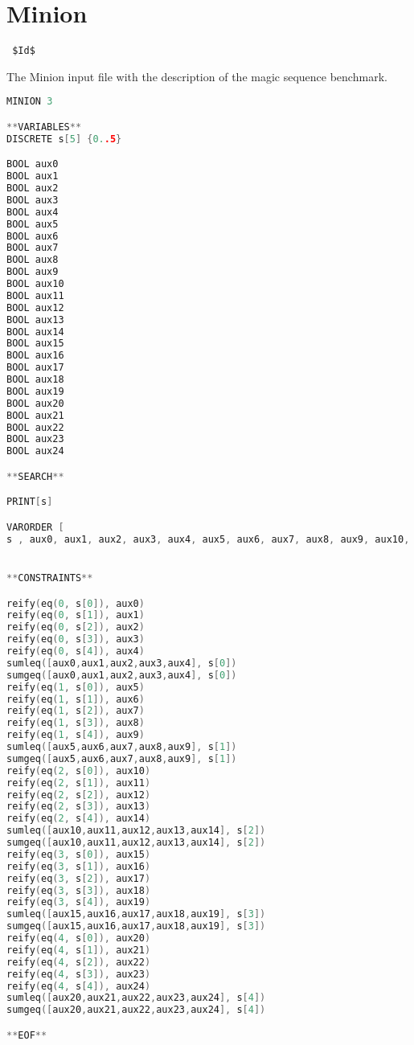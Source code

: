 \section{Minion}
\label{implementation:minion}
\verb= $Id$ =

The Minion input file with the description of the magic sequence benchmark. 

\begin{lstlisting}[language=C++]
MINION 3

**VARIABLES**
DISCRETE s[5] {0..5}

BOOL aux0
BOOL aux1
BOOL aux2
BOOL aux3
BOOL aux4
BOOL aux5
BOOL aux6
BOOL aux7
BOOL aux8
BOOL aux9
BOOL aux10
BOOL aux11
BOOL aux12
BOOL aux13
BOOL aux14
BOOL aux15
BOOL aux16
BOOL aux17
BOOL aux18
BOOL aux19
BOOL aux20
BOOL aux21
BOOL aux22
BOOL aux23
BOOL aux24

**SEARCH**

PRINT[s]

VARORDER [
s , aux0, aux1, aux2, aux3, aux4, aux5, aux6, aux7, aux8, aux9, aux10, aux11, aux12, aux13, aux14, aux15, aux16, aux17, aux18, aux19, aux20, aux21, aux22, aux23, aux24]


**CONSTRAINTS**

reify(eq(0, s[0]), aux0)
reify(eq(0, s[1]), aux1)
reify(eq(0, s[2]), aux2)
reify(eq(0, s[3]), aux3)
reify(eq(0, s[4]), aux4)
sumleq([aux0,aux1,aux2,aux3,aux4], s[0])
sumgeq([aux0,aux1,aux2,aux3,aux4], s[0])
reify(eq(1, s[0]), aux5)
reify(eq(1, s[1]), aux6)
reify(eq(1, s[2]), aux7)
reify(eq(1, s[3]), aux8)
reify(eq(1, s[4]), aux9)
sumleq([aux5,aux6,aux7,aux8,aux9], s[1])
sumgeq([aux5,aux6,aux7,aux8,aux9], s[1])
reify(eq(2, s[0]), aux10)
reify(eq(2, s[1]), aux11)
reify(eq(2, s[2]), aux12)
reify(eq(2, s[3]), aux13)
reify(eq(2, s[4]), aux14)
sumleq([aux10,aux11,aux12,aux13,aux14], s[2])
sumgeq([aux10,aux11,aux12,aux13,aux14], s[2])
reify(eq(3, s[0]), aux15)
reify(eq(3, s[1]), aux16)
reify(eq(3, s[2]), aux17)
reify(eq(3, s[3]), aux18)
reify(eq(3, s[4]), aux19)
sumleq([aux15,aux16,aux17,aux18,aux19], s[3])
sumgeq([aux15,aux16,aux17,aux18,aux19], s[3])
reify(eq(4, s[0]), aux20)
reify(eq(4, s[1]), aux21)
reify(eq(4, s[2]), aux22)
reify(eq(4, s[3]), aux23)
reify(eq(4, s[4]), aux24)
sumleq([aux20,aux21,aux22,aux23,aux24], s[4])
sumgeq([aux20,aux21,aux22,aux23,aux24], s[4])

**EOF**
\end{lstlisting}
